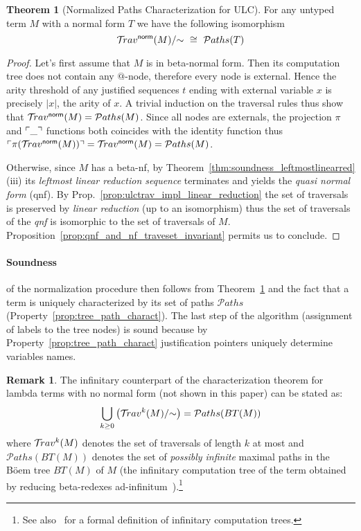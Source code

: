 \documentclass{article}
\theoremstyle{definition}
\newtheorem{remark}{Remark}[section]
\newtheorem{theorem}{Theorem}[section]
\newcommand{\normalizing}{{\sf norm}}
\newcommand{\travsetnorm}{\travset^\normalizing}
\newcommand{\travulc}{\travset}
\def\coresymbol{\pi} %
\newcommand{\core}[1]{\coresymbol(#1)} %
\newcommand\pathset{{\mathcal{P}aths}} %
\begin{document}
\begin{theorem}[Normalized Paths Characterization for ULC]
\label{thm:path_charact_ulc}
For any untyped term $M$ with a normal form $T$ we have the following isomorphism
$$\travsetnorm(M)/{\sim} \ \cong\ \pathset(T)$$
\end{theorem}
\begin{proof}%
Let's first assume that $M$ is in beta-normal form. Then its computation tree does not contain any $@$-node, therefore every node is external.
Hence the arity threshold of any justified sequences $t$ ending with external variable $x$ is precisely $|x|$, the arity of $x$. A trivial induction on the traversal rules thus show that $\travsetnorm(M) = \pathset(M)$. Since all nodes are externals, the projection $\coresymbol$ and $\ulcorner \_ \urcorner$ functions both coincides with the identity function thus $\pview{\core{\travsetnorm(M)}} = \travsetnorm(M) = \pathset(M)$.

Otherwise, since $M$ has a beta-nf, by Theorem~\ref{thm:soundness_leftmostlinearred}(iii) its \emph{leftmost linear reduction sequence} terminates and yields the \emph{quasi normal form} (qnf). By Prop.~\ref{prop:ulctrav_impl_linear_reduction} the set of traversals is preserved by \emph{linear reduction} (up to an isomorphism) thus the set of traversals of the \emph{qnf} is isomorphic to the set of traversals of $M$. Proposition~\ref{prop:qnf_and_nf_traveset_invariant} permits us to conclude.
\end{proof}


\paragraph{Soundness} of the normalization procedure then follows from Theorem~\ref{thm:path_charact_ulc} and the fact that a term is uniquely characterized by its set of paths $\pathset$ (Property~\ref{prop:tree_path_charact}). The last step of the algorithm (assignment of labels to the tree nodes) is sound because by Property~\ref{prop:tree_path_charact} justification pointers uniquely determine variables names.

\begin{remark}
The infinitary counterpart of the characterization theorem for lambda terms with no normal form (not shown in this paper) can be stated as:
$$ \Union_{k\geq0} \left(\travulc^k(M)/{\sim}\right) = \pathset(BT(M))$$
where $\travulc^k(M)$ denotes the set of traversals of length $k$ at most and $\pathset(BT(M))$ denotes the set of \emph{possibly infinite} maximal paths in the B\"oem tree $BT(M)$ of $M$ (the infinitary computation tree of the term obtained by reducing beta-redexes ad-infinitum~\cite{barendregt2013lambda}).\footnote{See also~\cite{Blum17-HomogNotRestriction, Ong2006} for a formal definition of infinitary computation trees.}
\end{remark}
\end{document}
